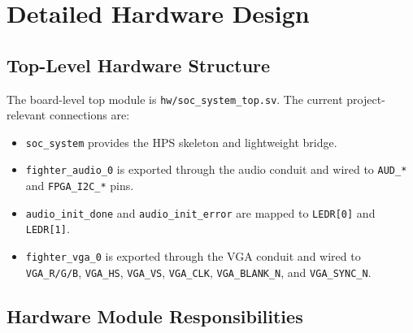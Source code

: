\documentclass[12pt,a4paper]{article}
\begin{document}
\section{Detailed Hardware Design}

\subsection{Top-Level Hardware Structure}

The board-level top module is \texttt{hw/soc\_system\_top.sv}. The current
project-relevant connections are:

\begin{itemize}
  \item \texttt{soc\_system} provides the HPS skeleton and lightweight bridge.
  \item \texttt{fighter\_audio\_0} is exported through the audio conduit and
  wired to \texttt{AUD\_*} and \texttt{FPGA\_I2C\_*} pins.
  \item \texttt{audio\_init\_done} and \texttt{audio\_init\_error} are mapped
  to \texttt{LEDR[0]} and \texttt{LEDR[1]}.
  \item \texttt{fighter\_vga\_0} is exported through the VGA conduit and wired
  to \texttt{VGA\_R/G/B}, \texttt{VGA\_HS}, \texttt{VGA\_VS},
  \texttt{VGA\_CLK}, \texttt{VGA\_BLANK\_N}, and \texttt{VGA\_SYNC\_N}.
\end{itemize}

\subsection{Hardware Module Responsibilities}
\end{document}
